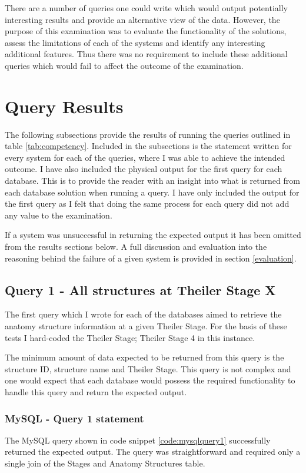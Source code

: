 There are a number of queries one could write which would output potentially interesting results and provide an alternative view of the data. However, the purpose of this examination was to evaluate the functionality of the solutions, assess the limitations of each of the systems and identify any interesting additional features. Thus there was no requirement to include these additional queries which would fail to affect the outcome of the examination.

\section{Query Results}\label{queryresults}
The following subsections provide the results of running the queries outlined in table \ref{tab:competency}. Included in the subsections is the statement written for every system for each of the queries, where I was able to achieve the intended outcome. I have also included the physical output for the first query for each database. This is to provide the reader with an insight into what is returned from each database solution when running a query. I have only included the output for the first query as I felt that doing the same process for each query did not add any value to the examination.

If a system was unsuccessful in returning the expected output it has been omitted from the results sections below. A full discussion and evaluation into the reasoning behind the failure of a given system is provided in section \ref{evaluation}.

\subsection*{Query 1 - All structures at Theiler Stage X}\label{query1}
The first query which I wrote for each of the databases aimed to retrieve the anatomy structure information at a given Theiler Stage. For the basis of these tests I hard-coded the Theiler Stage; Theiler Stage 4 in this instance.

The minimum amount of data expected to be returned from this query is the structure ID, structure name and Theiler Stage. This query is not complex and one would expect that each database would possess the required functionality to handle this query and return the expected output.

\subsubsection*{MySQL - Query 1 statement}\label{mysqlquery1statement}
The MySQL query shown in code snippet \ref{code:mysqlquery1} successfully returned the expected output. The query was straightforward and required only a single join of the Stages and Anatomy Structures table.


